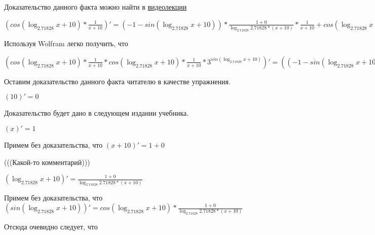 \documentclass[12pt,a4paper,fleqn]{article}
\theoremstyle{definition}
\begin{document}
Доказательство данного факта можно найти в \href{https://www.youtube.com/watch?v=dQw4w9WgXcQ}{видеолекции}

$(cos(\log_{ 2.71828 }{ x  +  10 }) * \frac{ 1 }{ x  +  10 }
)' = ( -1  - sin(\log_{ 2.71828 }{ x  +  10 })) * \frac{ 1  +  0 }{\log_{ 2.71828 }{ 2.71828 } * ( x  +  10 )}
 * \frac{ 1 }{ x  +  10 }
 + cos(\log_{ 2.71828 }{ x  +  10 }) * \frac{ 0  * ( x  +  10 ) -  1  * ( 1  +  0 )}{( x  +  10 ) * ( x  +  10 )}
$

Используя Wolfram легко получить, что

$(cos(\log_{ 2.71828 }{ x  +  10 }) * \frac{ 1 }{ x  +  10 }
 * cos(\log_{ 2.71828 }{ x  +  10 }) * \frac{ 1 }{ x  +  10 }
 * { 3 }^{sin(\log_{ 2.71828 }{ x  +  10 })})' = (( -1  - sin(\log_{ 2.71828 }{ x  +  10 })) * \frac{ 1  +  0 }{\log_{ 2.71828 }{ 2.71828 } * ( x  +  10 )}
 * \frac{ 1 }{ x  +  10 }
 + cos(\log_{ 2.71828 }{ x  +  10 }) * \frac{ 0  * ( x  +  10 ) -  1  * ( 1  +  0 )}{( x  +  10 ) * ( x  +  10 )}
) * cos(\log_{ 2.71828 }{ x  +  10 }) * \frac{ 1 }{ x  +  10 }
 * { 3 }^{sin(\log_{ 2.71828 }{ x  +  10 })} + cos(\log_{ 2.71828 }{ x  +  10 }) * \frac{ 1 }{ x  +  10 }
 * ((( -1  - sin(\log_{ 2.71828 }{ x  +  10 })) * \frac{ 1  +  0 }{\log_{ 2.71828 }{ 2.71828 } * ( x  +  10 )}
 * \frac{ 1 }{ x  +  10 }
 + cos(\log_{ 2.71828 }{ x  +  10 }) * \frac{ 0  * ( x  +  10 ) -  1  * ( 1  +  0 )}{( x  +  10 ) * ( x  +  10 )}
) * { 3 }^{sin(\log_{ 2.71828 }{ x  +  10 })} + cos(\log_{ 2.71828 }{ x  +  10 }) * \frac{ 1 }{ x  +  10 }
 * \log_{ 2.71828 }{ 3 } * cos(\log_{ 2.71828 }{ x  +  10 }) * \frac{ 1  +  0 }{\log_{ 2.71828 }{ 2.71828 } * ( x  +  10 )}
 * { 3 }^{sin(\log_{ 2.71828 }{ x  +  10 })})$

Оставим доказательство данного факта читателю в качестве упражнения.

$( 10 )' =  0 $

Доказательство будет дано в следующем издании учебника.

$( x )' =  1 $

Примем без доказательства, что
$( x  +  10 )' =  1  +  0 $

(((Какой-то комментарий)))

$(\log_{ 2.71828 }{ x  +  10 })' = \frac{ 1  +  0 }{\log_{ 2.71828 }{ 2.71828 } * ( x  +  10 )}
$

Примем без доказательства, что
$(sin(\log_{ 2.71828 }{ x  +  10 }))' = cos(\log_{ 2.71828 }{ x  +  10 }) * \frac{ 1  +  0 }{\log_{ 2.71828 }{ 2.71828 } * ( x  +  10 )}
$

Отсюда очевидно следует, что
\end{document}
